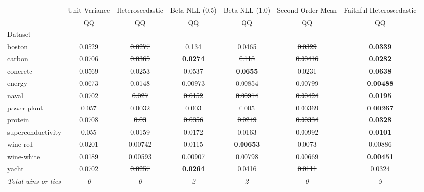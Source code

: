 \begin{tabular}{l|c|c|c|c|c|c}
\toprule
{} & {Unit Variance} & {Heteroscedastic} & {Beta NLL (0.5)} & {Beta NLL (1.0)} & {Second Order Mean} & {Faithful Heteroscedastic} \\
{} & {QQ} & {QQ} & {QQ} & {QQ} & {QQ} & {QQ} \\
{Dataset} & {} & {} & {} & {} & {} & {} \\
\midrule
boston & 0.0529 & \sout{0.0277} & 0.134 & 0.0465 & \sout{0.0329} & \textbf{0.0339} \\
carbon & 0.0706 & \sout{0.0365} & \textbf{0.0274} & \sout{0.118} & \sout{0.00416} & \textbf{0.0282} \\
concrete & 0.0569 & \sout{0.0253} & \sout{0.0537} & \textbf{0.0655} & \sout{0.0231} & \textbf{0.0638} \\
energy & 0.0673 & \sout{0.0148} & \sout{0.00973} & \sout{0.00854} & \sout{0.00799} & \textbf{0.00488} \\
naval & 0.0702 & \sout{0.027} & \sout{0.0152} & \sout{0.00914} & \sout{0.00424} & \textbf{0.0195} \\
power plant & 0.057 & \sout{0.0032} & \sout{0.003} & \sout{0.005} & \sout{0.00369} & \textbf{0.00267} \\
protein & 0.0708 & \sout{0.03} & \sout{0.0356} & \sout{0.0249} & \sout{0.00334} & \textbf{0.0328} \\
superconductivity & 0.055 & \sout{0.0159} & 0.0172 & \sout{0.0163} & \sout{0.00992} & \textbf{0.0101} \\
wine-red & 0.0201 & 0.00742 & 0.0115 & \textbf{0.00653} & 0.0073 & 0.00886 \\
wine-white & 0.0189 & 0.00593 & 0.00907 & 0.00798 & 0.00669 & \textbf{0.00451} \\
yacht & 0.0702 & \sout{0.0257} & \textbf{0.0264} & 0.0416 & \sout{0.0111} & 0.0324 \\
\textit{{Total wins or ties}} & \textit{0} & \textit{0} & \textit{2} & \textit{2} & \textit{0} & \textit{9} \\
\bottomrule
\end{tabular}
